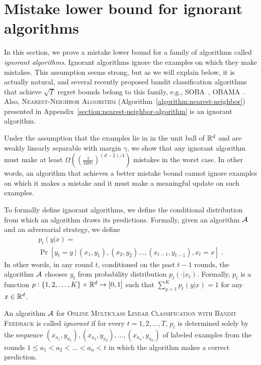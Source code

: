 \section{Mistake lower bound for ignorant algorithms}
\label{section:mistake-lower-bound-for-ignorant-algorithms}

In this section, we prove a mistake lower bound for a family of algorithms
called \textit{ignorant algorithms}. Ignorant algorithms ignore the examples on
which they make mistakes. This assumption seems strong, but as we will explain
below, it is actually natural, and several recently proposed bandit
classification algorithms that achieve $\sqrt{T}$ regret bounds belong to this
family, e.g., SOBA~\citep{Beygelzimer-Orabona-Zhang-2017},
OBAMA~\citep{Foster-Kale-Luo-Mohri-Sridharan-2018}. Also,
\textsc{Nearest-Neighbor Algorithm} (Algorithm~\ref{algorithm:nearest-neighbor})
presented in Appendix~\ref{section:nearest-neighbor-algorithm} is an ignorant
algorithm.

Under the assumption that the examples lie in in the unit ball of $\mathbb{R}^d$ and are
weakly linearly separable with margin $\gamma$, we show that any ignorant
algorithm must make at least $\Omega \left( \left(\frac{1}{160
\gamma}\right)^{(d-2)/4} \right)$ mistakes in the worst case. In other words, an
algorithm that achieves a better mistake bound cannot ignore examples on which
it makes a mistake and it must make a meaningful update on such examples.

To formally define ignorant algorithms, we define the conditional distribution
from which an algorithm draws its predictions. Formally, given an algorithm
$\mathcal{A}$ and an adversarial strategy, we define
\begin{multline*}
p_t(y|x) = \\
\Pr[y_t = y ~|~ (x_1, y_1), (x_2, y_2) \dots, (x_{t-1}, y_{t-1}), x_t = x] \; .
\end{multline*}
In other words, in any round $t$, conditioned on the past $t-1$ rounds, the
algorithm $\mathcal{A}$ chooses $y_t$ from probability distribution $p_t(\cdot|x_t)$.
Formally, $p_t$ is a function $p:\{1,2,\dots,K\} \times \mathbb{R}^d \to [0,1]$
such that $\sum_{y=1}^K p_t(y|x) = 1$ for any $x \in \mathbb{R}^d$.

\begin{definition}
An algorithm $\mathcal{A}$ for \textsc{Online Multiclass Linear Classification with
Bandit Feedback} is called \emph{ignorant} if for every $t=1,2,\dots,T$,
$p_t$ is determined solely by the sequence
$(x_{a_1}, y_{a_1}), (x_{a_2}, y_{a_2}), \dots, (x_{a_n}, y_{a_n})$
of labeled examples
from the rounds $1 \le a_1 < a_2 < \dots < a_n < t$ in which
the algorithm makes a correct prediction.
\end{definition}

